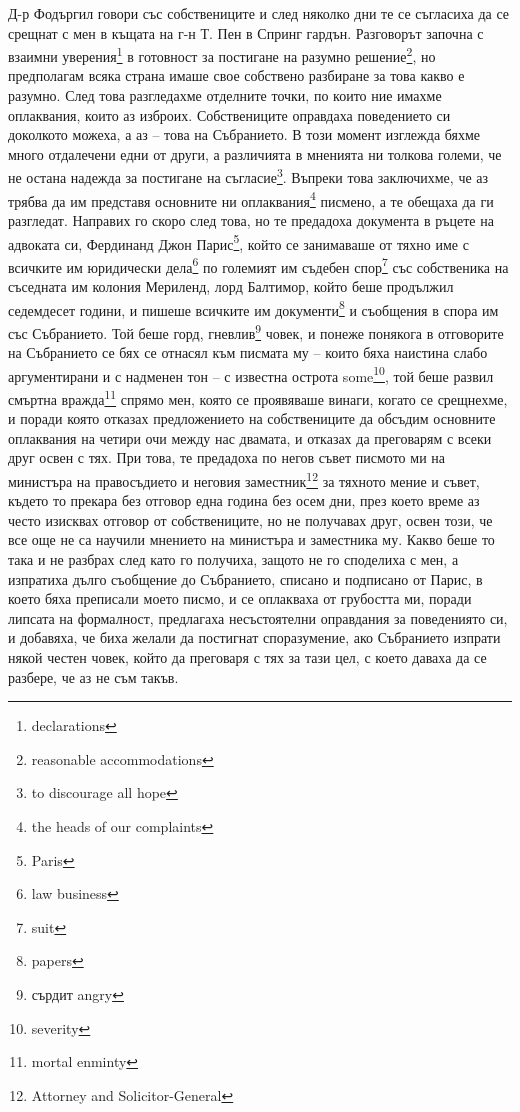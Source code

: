 \documentclass[12pt]{book}
\begin{document}
Д-р Фодъргил говори със собствениците и след няколко дни те се съгласиха да се срещнат с мен в къщата на г-н Т. Пен в Спринг гардън. Разговорът започна с взаимни уверения\footnote{declarations} в готовност за постигане на разумно решение\footnote{reasonable accommodations}, но предполагам всяка страна имаше свое собствено разбиране за това какво е разумно. След това разгледахме отделните точки, по които ние имахме оплаквания, които аз изброих. Собствениците оправдаха поведението си доколкото можеха, а аз – това на Събранието. В този момент изглежда бяхме много отдалечени едни от други, а различията в мненията ни толкова големи, че не остана надежда за постигане на съгласие\footnote{to discourage all hope}. Въпреки това заключихме, че аз трябва да им представя основните ни оплаквания\footnote{the heads of our complaints} писмено, а те обещаха да ги разгледат. Направих го скоро след това, но те предадоха документа в ръцете на адвоката си, Фердинанд Джон Парис\footnote{Paris}, който се занимаваше от тяхно име с всичките им юридически дела\footnote{law business} по големият им съдебен спор\footnote{suit} със собственика на съседната им колония Мериленд, лорд Балтимор, който беше продължил седемдесет години, и пишеше всичките им документи\footnote{papers} и съобщения в спора им със Събранието. Той беше горд, гневлив\footnote{сърдит angry} човек, и понеже понякога в отговорите на Събранието се бях се отнасял към писмата му – които бяха наистина слабо аргументирани и с надменен тон – с известна острота some\footnote{severity}, той беше развил смъртна вражда\footnote{mortal enminty} спрямо мен, която се проявяваше винаги, когато се срещнехме, и поради която отказах предложението на собствениците да обсъдим основните оплаквания на четири очи между нас двамата, и отказах да преговарям с всеки друг освен с тях. При това, те предадоха по негов съвет писмото ми на министъра на правосъдието и неговия заместник\footnote{Attorney and Solicitor-General} за тяхното мение и съвет, където то прекара без отговор една година без осем дни, през което време аз често изисквах отговор от собствениците, но не получавах друг, освен този, че все още не са научили мнението на министъра и заместника му. Какво беше то така и не разбрах след като го получиха, защото не го споделиха с мен, а изпратиха дълго съобщение до Събранието, списано и подписано от Парис, в което бяха преписали моето писмо, и се оплакваха от грубостта ми, поради липсата на формалност, предлагаха несъстоятелни оправдания за поведениято си, и добавяха, че биха желали да постигнат споразумение, ако Събранието изпрати някой честен човек, който да преговаря с тях за тази цел, с което даваха да се разбере, че аз не съм такъв. 
\end{document}
